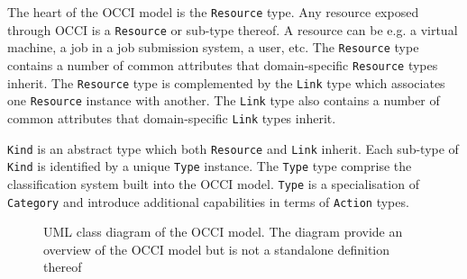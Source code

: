 \documentclass[10pt,a4paper,british]{article}
\newcommand{\hl}{\texttt}
\begin{document}
The heart of the OCCI model is the \hl{Resource} type. Any resource exposed
through OCCI is a \hl{Resource} or sub-type thereof.
A resource can be e.g. a virtual machine, a job in a job submission system, a
user, etc.
%
The \hl{Resource} type contains a number of common attributes that
domain-specific \hl{Resource} types inherit. The \hl{Resource} type is
complemented by the \hl{Link} type which associates one \hl{Resource} instance
with another.
%
The \hl{Link} type also contains a number of common attributes that
domain-specific \hl{Link} types inherit.

\hl{Kind} is an abstract type which both \hl{Resource} and \hl{Link} inherit.
Each sub-type of \hl{Kind} is identified by a unique \hl{Type} instance.
%
The \hl{Type} type comprise the classification system built into the OCCI
model. \hl{Type} is a specialisation of \hl{Category} and introduce additional
capabilities in terms of \hl{Action} types.

\begin{figure}[!h]
{\centering {} \par}
\caption{UML class diagram of the OCCI model. The diagram provide an
overview of the OCCI model but is not a standalone definition thereof}
\label{fig:occi_model}
\end{figure}
\end{document}

